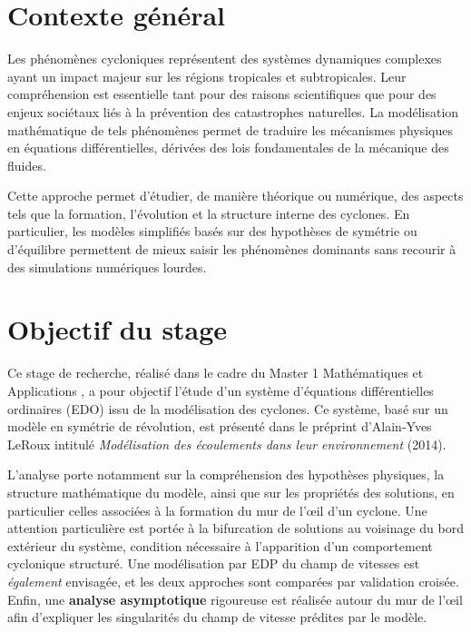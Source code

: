 \section*{Contexte g\'en\'eral}

Les ph\'enom\`enes cycloniques repr\'esentent des syst\`emes dynamiques complexes ayant un impact majeur sur les r\'egions tropicales et subtropicales. Leur compr\'ehension est essentielle tant pour des raisons scientifiques que pour des enjeux soci\'etaux li\'es \`a la pr\'evention des catastrophes naturelles. La mod\'elisation math\'ematique de tels ph\'enom\`enes permet de traduire les m\'ecanismes physiques en \'equations diff\'erentielles, d\'eriv\'ees des lois fondamentales de la m\'ecanique des fluides.

Cette approche permet d'\'etudier, de mani\`ere th\'eorique ou num\'erique, des aspects tels que la formation, l'\'evolution et la structure interne des cyclones. En particulier, les mod\`eles simplifi\'es bas\'es sur des hypoth\`eses de sym\'etrie ou d'\'equilibre permettent de mieux saisir les ph\'enom\`enes dominants sans recourir \`a des simulations num\'eriques lourdes.

\section*{Objectif du stage}

Ce stage de recherche, r\'ealis\'e dans le cadre du Master 1 \og Math\'ematiques et Applications \fg{}, a pour objectif l'\'etude d'un syst\`eme d'\'equations diff\'erentielles ordinaires (EDO) issu de la mod\'elisation des cyclones. Ce syst\`eme, bas\'e sur un mod\`ele en sym\'etrie de r\'evolution, est pr\'esent\'e dans le pr\'eprint d'Alain-Yves LeRoux intitul\'e \textit{Mod\'elisation des \'ecoulements dans leur environnement} (2014).

L'analyse porte notamment sur la compr\'ehension des hypoth\`eses physiques, la structure math\'ematique du mod\`ele, ainsi que sur les propri\'et\'es des solutions, en particulier celles associ\'ees \`a la formation du mur de l'\oe il d'un cyclone. Une attention particuli\`ere est port\'ee \`a la bifurcation de solutions au voisinage du bord ext\'erieur du syst\`eme, condition n\'ecessaire \`a l'apparition d'un comportement cyclonique structur\'e. Une mod\'elisation par EDP du champ de vitesses est \textit{\'egalement} envisag\'ee, et les deux approches sont compar\'ees par validation crois\'ee. Enfin, une \textbf{analyse asymptotique} rigoureuse est r\'ealis\'ee autour du mur de l'\oe il afin d'expliquer les singularit\'es du champ de vitesse pr\'edites par le mod\`ele.

